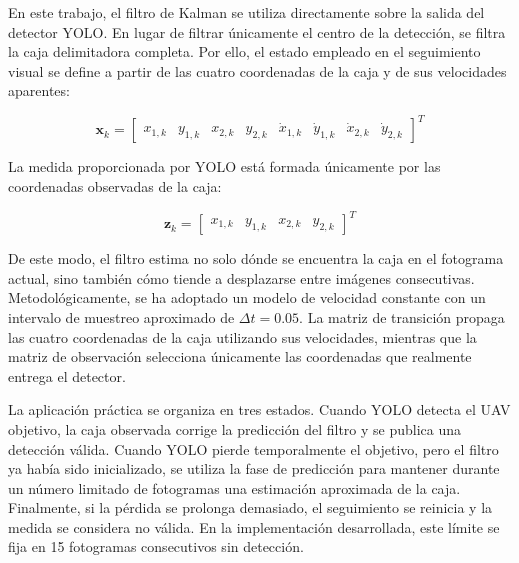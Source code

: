 \vspace{0.3cm}

En este trabajo, el filtro de Kalman se utiliza directamente sobre la salida del detector YOLO. En lugar de filtrar únicamente el centro de la detección, se filtra la caja delimitadora completa. Por ello, el estado empleado en el seguimiento visual se define a partir de las cuatro coordenadas de la caja y de sus velocidades aparentes:

\vspace{0.3cm}

\begin{equation}
\mathbf{x}_k = \left[ \begin{array}{cccccccc}
x_{1,k} & y_{1,k} & x_{2,k} & y_{2,k} & \dot{x}_{1,k} & \dot{y}_{1,k} & \dot{x}_{2,k} & \dot{y}_{2,k}
\end{array} \right]^{T}
\end{equation}

\vspace{0.3cm}

La medida proporcionada por YOLO está formada únicamente por las coordenadas observadas de la caja:

\vspace{0.3cm}

\begin{equation}
\mathbf{z}_k = \left[ \begin{array}{cccc}
x_{1,k} & y_{1,k} & x_{2,k} & y_{2,k}
\end{array} \right]^{T}
\end{equation}

\vspace{0.3cm}

De este modo, el filtro estima no solo dónde se encuentra la caja en el fotograma actual, sino también cómo tiende a desplazarse entre imágenes consecutivas. Metodológicamente, se ha adoptado un modelo de velocidad constante con un intervalo de muestreo aproximado de $\Delta t = 0.05$. La matriz de transición propaga las cuatro coordenadas de la caja utilizando sus velocidades, mientras que la matriz de observación selecciona únicamente las coordenadas que realmente entrega el detector.

\vspace{0.3cm}

La aplicación práctica se organiza en tres estados. Cuando YOLO detecta el UAV objetivo, la caja observada corrige la predicción del filtro y se publica una detección válida. Cuando YOLO pierde temporalmente el objetivo, pero el filtro ya había sido inicializado, se utiliza la fase de predicción para mantener durante un número limitado de fotogramas una estimación aproximada de la caja. Finalmente, si la pérdida se prolonga demasiado, el seguimiento se reinicia y la medida se considera no válida. En la implementación desarrollada, este límite se fija en 15 fotogramas consecutivos sin detección.

